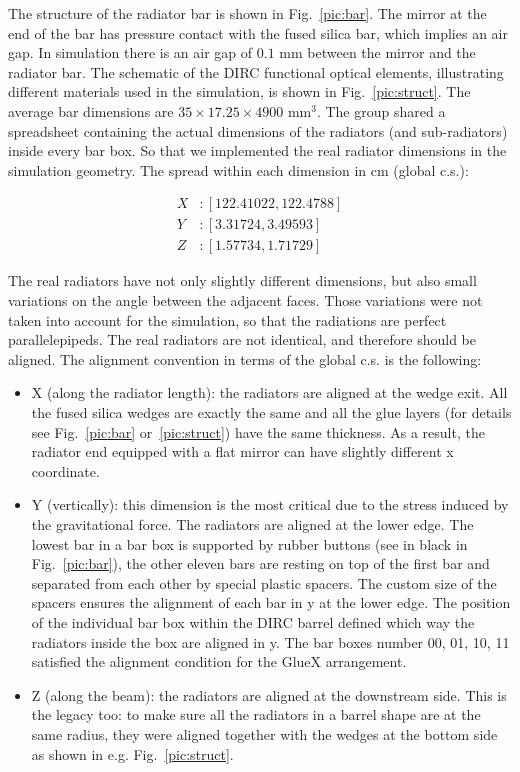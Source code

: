 The structure of the radiator bar is shown in Fig.~\ref{pic:bar}. The mirror at the end of the bar has pressure contact with the fused silica bar, which implies an air gap. In simulation there is an air gap of $0.1$ mm between the mirror and the radiator bar. The schematic of the \gluex DIRC functional optical elements, illustrating different materials used in the simulation, is shown in Fig.~\ref{pic:struct}. 
The average bar dimensions are $35 \times 17.25 \times 4900 $ mm$^3$. The \babar group shared a spreadsheet containing the actual dimensions of the radiators (and sub-radiators) inside every bar box. So that we implemented the real radiator dimensions in the simulation geometry. The spread within each dimension in cm (global c.s.):

\begin{align}
X &:  [122.41022, 122.4788] \\
Y &:  [3.31724, 3.49593] \\
Z &:  [1.57734, 1.71729]
\end{align}

The real radiators have not only slightly different dimensions, but also small variations on the angle between the adjacent faces. Those variations were not taken into account for the simulation, so that the radiations are perfect parallelepipeds.
The real radiators are not identical, and therefore should be aligned. The alignment convention in terms of the global c.s. is the following:

\begin{itemize}
\item X (along the radiator length): the radiators are aligned at the wedge exit. All the fused silica wedges are exactly the same and all the glue layers (for details see Fig.~\ref{pic:bar} or~\ref{pic:struct}) have the same thickness. As a result, the radiator end equipped with a flat mirror can have slightly different x coordinate.
\item Y (vertically): this dimension is the most critical due to the stress induced by the gravitational force. The radiators are aligned at the lower edge. The lowest bar in a bar box is supported by rubber buttons (see in black in Fig.~\ref{pic:bar}), the other eleven bars are resting on top of the first bar and separated from each other by special plastic spacers. The custom size of the spacers ensures the alignment of each bar in y at the lower edge. The position of the individual bar box within the \babar DIRC barrel defined which way the radiators inside the box are aligned in y. 
The \babar bar boxes number 00, 01, 10, 11 satisfied the alignment condition for the GlueX arrangement.
\item Z (along the beam): the radiators are aligned at the downstream side. This is the \babar legacy too: to make sure all the radiators in a barrel shape are at the same radius, they were aligned together with the wedges at the bottom side as shown in e.g. Fig.~\ref{pic:struct}.
\end{itemize}

